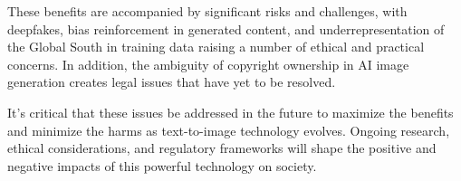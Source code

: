 \documentclass[11pt]{article}
\begin{document}
These benefits are accompanied by significant risks and challenges, with deepfakes, bias reinforcement in generated content, and underrepresentation of the Global South in training data raising a number of ethical and practical concerns. In addition, the ambiguity of copyright ownership in AI image generation creates legal issues that have yet to be resolved.

It's critical that these issues be addressed in the future to maximize the benefits and minimize the harms as text-to-image technology evolves. Ongoing research, ethical considerations, and regulatory frameworks will shape the positive and negative impacts of this powerful technology on society.



\newpage


\end{document}
